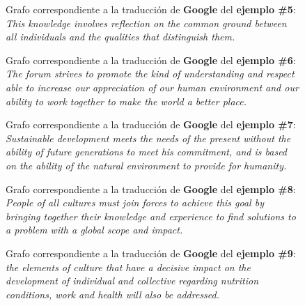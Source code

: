 \documentclass[a4paper,12pt,spanish]{book}
\begin{document}
\begin{figure}[htbp]
\centering
\capstart

\caption[Grafo correspondiente a la traducción de Google del ejemplo \#5.]{Grafo correspondiente a la traducción de \textbf{Google} del \textbf{ejemplo \#5}:
\emph{This knowledge involves reflection on the common ground between all
individuals and the qualities that distinguish them.}}\label{appendix-data:sample05-google}\end{figure}
\begin{figure}[htbp]
\centering
\capstart

\caption[Grafo correspondiente a la traducción de Google del ejemplo \#6.]{Grafo correspondiente a la traducción de \textbf{Google} del \textbf{ejemplo \#6}:
\emph{The forum strives to promote the kind of understanding and respect able
to increase our appreciation of our human environment and our ability to
work together to make the world a better place.}}\label{appendix-data:sample06-google}\end{figure}
\begin{figure}[htbp]
\centering
\capstart

\caption[Grafo correspondiente a la traducción de Google del ejemplo \#7.]{Grafo correspondiente a la traducción de \textbf{Google} del \textbf{ejemplo \#7}:
\emph{Sustainable development meets the needs of the present without the ability
of future generations to meet his commitment, and is based on the ability
of the natural environment to provide for humanity.}}\label{appendix-data:sample07-google}\end{figure}
\begin{figure}[htbp]
\centering
\capstart

\caption[Grafo correspondiente a la traducción de Google del ejemplo \#8.]{Grafo correspondiente a la traducción de \textbf{Google} del \textbf{ejemplo \#8}:
\emph{People of all cultures must join forces to achieve this goal by bringing
together their knowledge and experience to find solutions to a problem
with a global scope and impact.}}\label{appendix-data:sample08-google}\end{figure}
\begin{figure}[htbp]
\centering
\capstart

\caption[Grafo correspondiente a la traducción de Google del ejemplo \#9.]{Grafo correspondiente a la traducción de \textbf{Google} del \textbf{ejemplo \#9}:
\emph{the elements of culture that have a decisive impact on the development
of individual and collective regarding nutrition conditions, work and
health will also be addressed.}}\label{appendix-data:sample09-google}\end{figure}
\end{document}
